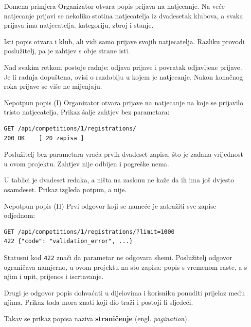 \begin{frame}{Domena primjera}
Organizator otvara popis prijava na natjecanje. Na veće natjecanje prijavi se nekoliko stotina natjecatelja iz dvadesetak klubova, a svaka prijava ima natjecatelja, kategoriju, zbroj i stanje.

\vspace{0.9em}
Isti popis otvara i klub, ali vidi samo prijave svojih natjecatelja. Razliku provodi poslužitelj, pa je zahtjev s obje strane isti.

\vspace{0.9em}
Nad svakim retkom postoje radnje: odjava prijave i povratak odjavljene prijave. Je li radnja dopuštena, ovisi o razdoblju u kojem je natjecanje. Nakon konačnog roka prijave se više ne mijenjaju.
\end{frame}

\begin{frame}[fragile]{Nepotpun popis (I)}
Organizator otvara prijave na natjecanje na koje se prijavilo tristo natjecatelja. Prikaz šalje zahtjev bez parametara:

\begin{lstlisting}
GET /api/competitions/1/registrations/
200 OK    [ 20 zapisa ]
\end{lstlisting}

\vspace{0.5em}
Poslužitelj bez parametara vraća prvih dvadeset zapisa, što je zadana vrijednost u ovom projektu. Zahtjev nije odbijen i pogreške nema.

\vspace{0.5em}
U tablici je dvadeset redaka, a ništa na zaslonu ne kaže da ih ima još dvjesto osamdeset. Prikaz izgleda potpun, a nije.
\end{frame}

\begin{frame}[fragile]{Nepotpun popis (II)}
Prvi odgovor koji se nameće je zatražiti sve zapise odjednom:

\begin{lstlisting}
GET /api/competitions/1/registrations/?limit=1000
422 {"code": "validation_error", ...}
\end{lstlisting}

\vspace{0.4em}
Statusni kod \texttt{422} znači da parametar ne odgovara shemi. Poslužitelj odgovor ograničava namjerno, u ovom projektu na sto zapisa: popis s vremenom raste, a s njim i upit, prijenos i iscrtavanje.

\vspace{0.6em}
Drugi je odgovor popis dohvaćati u dijelovima i korisniku ponuditi prijelaz među njima. Prikaz tada mora znati koji dio traži i postoji li sljedeći.

\vspace{0.6em}
Takav se prikaz popisa naziva \textbf{straničenje} (engl. \emph{pagination}).
\end{frame}

